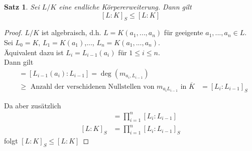 \documentclass[10pt,a4paper]{article}
\newcommand{\ol}[1]{\overline{#1}}
\theoremstyle{plain}
\newtheorem{satz}[theorem]{Satz}
\theoremstyle{definition}
\theoremstyle{remark}
\begin{document}
	\begin{satz}\label{satz:abschSepGrad}
		Sei $L/K$ eine endliche Körpererweiterung. Dann gilt\[[L:K]_S\leq [L:K]\]
	\end{satz}
	\begin{proof}
		$L/K$ ist algebraisch, d.h. $L=K(a_1,...,a_n)$ für geeigente $a_1,...,a_n\in L$.\\
		Sei $L_0=K$, $L_1=K(a_1)$,..., $L_n=K(a_1,...,a_n)$.\\
		Äquivalent dazu ist $L_i=L_{i-1}(a_i)$ für $1\leq i\leq n$.\\
		Dann gilt 
		\begin{align*}
		[L_{i}:L_{i-1}]&=[L_{i-1}(a_i):L_{i-1}]=\deg(m_{a_i,L_{i-1}})\\
		&\geq\text{ Anzahl der verschidenen Nullstellen von $m_{a_iL_{i-1}}$ in $\ol K$}
		&=[L_i:L_{i-1}]_S
		\end{align*}
		
		Da aber zusätzlich
		\begin{align*}
		[L:K]&=\prod_{i=1}^{n}[L_i:L_{i-1}]\\
		[L:K]_S&=\prod_{i=1}^{n}[L_i:L_{i-1}]_S
		\end{align*}
		folgt $[L:K]_S\leq[L:K]$
	\end{proof}
\end{document}
